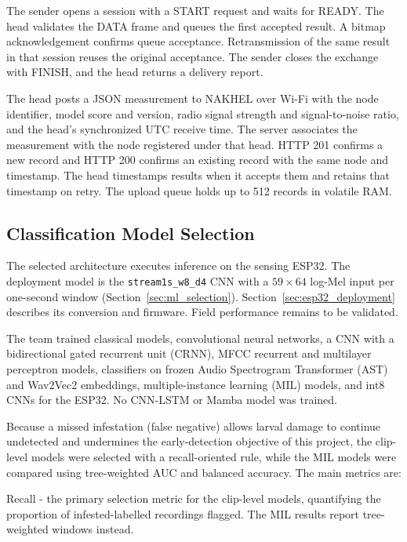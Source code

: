 \documentclass[12pt,a4paper,oneside]{memoir}
\newcommand{\newrevision}[1]{#1}
\begin{document}
\newrevision{The sender opens a session with a START request and waits for READY. The head validates the DATA frame and queues the first accepted result. A bitmap acknowledgement confirms queue acceptance. Retransmission of the same result in that session reuses the original acceptance. The sender closes the exchange with FINISH, and the head returns a delivery report.}

\newrevision{The head posts a JSON measurement to NAKHEL over Wi-Fi with the node identifier, model score and version, radio signal strength and signal-to-noise ratio, and the head's synchronized UTC receive time. The server associates the measurement with the node registered under that head. HTTP 201 confirms a new record and HTTP 200 confirms an existing record with the same node and timestamp. The head timestamps results when it accepts them and retains that timestamp on retry. The upload queue holds up to 512 records in volatile RAM.}





\subsection{Classification Model Selection}
\newrevision{The selected architecture executes inference on the sensing ESP32. The deployment model is the \texttt{stream1s\_w8\_d4} CNN with a $59 \times 64$ log-Mel input per one-second window (Section~\ref{sec:ml_selection}). Section~\ref{sec:esp32_deployment} describes its conversion and firmware. Field performance remains to be validated.}

\newrevision{The team trained classical models, convolutional neural networks, a CNN with a bidirectional gated recurrent unit (CRNN), MFCC recurrent and multilayer perceptron models, classifiers on frozen Audio Spectrogram Transformer (AST) and Wav2Vec2 embeddings, multiple-instance learning (MIL) models, and int8 CNNs for the ESP32. No CNN-LSTM or Mamba model was trained.}

Because a missed infestation (false negative) allows larval damage to continue undetected and undermines the early-detection objective of this project, \newrevision{the clip-level models were selected with a recall-oriented rule, while the MIL models were compared using tree-weighted AUC and balanced accuracy. The main metrics are:}

Recall - \newrevision{the primary selection metric for the clip-level models, quantifying the proportion of infested-labelled recordings flagged. The MIL results report tree-weighted windows instead.}
\end{document}
